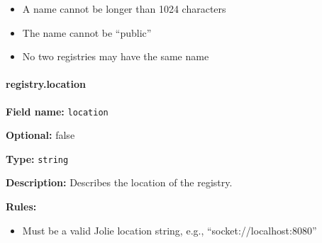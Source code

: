 \begin{itemize}
\tightlist
\item
  A name cannot be longer than 1024 characters
\item
  The name cannot be ``public''
\item
  No two registries may have the same name
\end{itemize}

\hypertarget{location}{\paragraph{registry.location}\label{location}}

\textbf{Field name:} \texttt{location}

\textbf{Optional:} false

\textbf{Type:} \texttt{string}

\textbf{Description:} Describes the location of the registry.

\textbf{Rules:}

\begin{itemize}
\tightlist
\item
  Must be a valid Jolie location string, e.g.,
  ``socket://localhost:8080''
\end{itemize}

